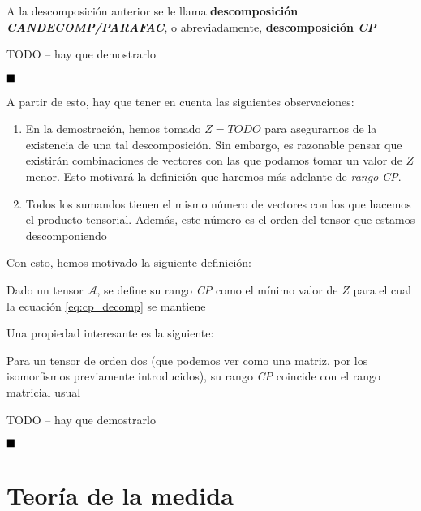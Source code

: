 A la descomposición anterior se le llama \textbf{descomposición \textit{CANDECOMP/PARAFAC}}, o abreviadamente, \textbf{descomposición \textit{CP}}

\demostracion

TODO -- hay que demostrarlo

$\customqed$

A partir de esto, hay que tener en cuenta las siguientes observaciones:

\begin{enumerate}
    \item En la demostración, hemos tomado $Z = TODO$ para asegurarnos de la existencia de una tal descomposición. Sin embargo, es razonable pensar que existirán combinaciones de vectores con las que podamos tomar un valor de $Z$ menor. Esto motivará la definición que haremos más adelante de \textit{rango CP}.
    \item Todos los sumandos tienen el mismo número de vectores con los que hacemos el producto tensorial. Además, este número es el orden del tensor que estamos descomponiendo
\end{enumerate}

Con esto, hemos motivado la siguiente definición:

\begin{definicion}
    Dado un tensor $\mathcal{A}$, se define su rango \textit{CP} como el mínimo valor de $Z$ para el cual la ecuación \eqref{eq:cp_decomp} se mantiene
\end{definicion}

Una propiedad interesante es la siguiente:

\begin{proposicion}[]
    Para un tensor de orden dos (que podemos ver como una matriz, por los isomorfismos previamente introducidos), su rango \textit{CP} coincide con el rango matricial usual
\end{proposicion}

\demostracion

TODO -- hay que demostrarlo

$\customqed$


\newpage
\section{Teoría de la medida}

\endinput

